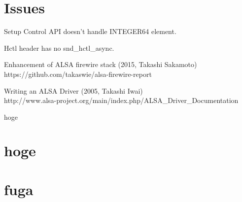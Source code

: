 \documentclass[onecolumn]{article}
\begin{document}
\section{Issues}

Setup Control API doesn't handle INTEGER64 element.

Hctl header has no snd\_hctl\_async.

\begin{thebibliography}{99}


Enhancement of ALSA firewire stack (2015, Takashi Sakamoto) \\
https://github.com/takaswie/alsa-firewire-report

Writing an ALSA Driver (2005, Takashi Iwai) \\
http://www.alsa-project.org/main/index.php/ALSA\_Driver\_Documentation

hoge

\end{thebibliography}

\newpage

\appendix


\section{hoge}

\section{fuga}
\end{document}
